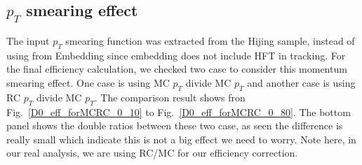 \begin{figure}
\end{figure}

\subsection{$p_T$ smearing effect} 

The input $p_T$ smearing function was extracted from the Hijing sample, instead of using from Embedding since embedding does not include HFT in tracking. For the final efficiency calculation, we checked two case to consider this momentum smearing effect. One case is using MC $p_T$ divide MC $p_T$ and another case is using RC $p_T$ divide MC $p_T$. The comparison result shows fron Fig.~\ref{D0_eff_forMCRC_0_10} to Fig.~\ref{D0_eff_forMCRC_0_80}. The bottom panel shows the double ratios between these two case, as seen the difference is really small which indicate this is not a big effect we need to worry. Note here, in our real analysis, we are using RC/MC for our efficiency correction.

